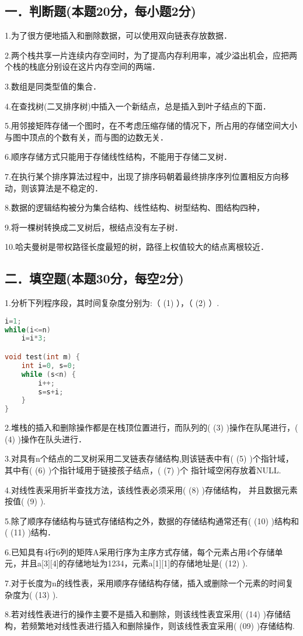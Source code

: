 
\subsection{一．判断题(本题20分，每小题2分)}
1.为了很方便地插入和删除数据，可以使用双向链表存放数据．

2.两个栈共享一片连续内存空间时，为了提高内存利用率，减少溢出机会，应把两个栈的栈底分别设在这片内存空间的两端．

3.数组是同类型值的集合．

4.在查找树(二叉排序树)中插入一个新结点，总是插入到叶子结点的下面．

5.用邻接矩阵存储一个图时，在不考虑压缩存储的情况下，所占用的存储空间大小与图中顶点的个数有关，而与图的边数无关．

6.顺序存储方式只能用于存储线性结构，不能用于存储二叉树．

7.在执行某个排序算法过程中，出现了排序码朝着最终排序序列位置相反方向移动，则该算法是不稳定的．

8.数据的逻辑结构被分为集合结构、线性结构、树型结构、图结构四种，

9.将一棵树转换成二叉树后，根结点没有左子树．

10.哈夫曼树是带权路径长度最短的树，路径上权值较大的结点离根较近．


\subsection{二．填空题(本题30分，每空2分)}
1.分析下列程序段，其时间复杂度分别为:（ (1) ），（ (2) ）.
\begin{lstlisting}[language=cpp]
i=1;
while(i<=n)
    i=i*3;

void test(int m) {
    int i=0, s=0;
    while (s<n) {
        i++;
        s=s+i;
    }
}
\end{lstlisting}

2.堆栈的插入和删除操作都是在栈顶位置进行，而队列的( (3) )操作在队尾进行，( (4) )操作在队头进行．

3.对具有n个结点的二叉树采用二叉链表存储结构,则该链表中有( (5) )个指针域，其中有( (6) )个指针域用于链接孩子结点，( (7) )个 指针域空闲存放着NULL.

4.对线性表采用折半查找方法，该线性表必须采用( (8) )存储结构， 并且数据元素按值( (9) ).

5.除了顺序存储结构与链式存储结构之外，数据的存储结构通常还有( (10) )结构和( (11) )结构．

6.已知具有4行6列的矩阵A采用行序为主序方式存储，每个元素占用4个存储单元，并且a[3][4]的存储地址为1234，元素a[1][1]的存储地址是( (12) ).

7.对于长度为n的线性表，采用顺序存储结构存储，插入或删除一个元素的时间复杂度为( (13) ).

8.若对线性表进行的操作主要不是插入和删除，则该线性表宜采用( (14) )存储结构，若频繁地对线性表进行插入和删除操作，则该线性表宜采用( (09) )存储结构.

